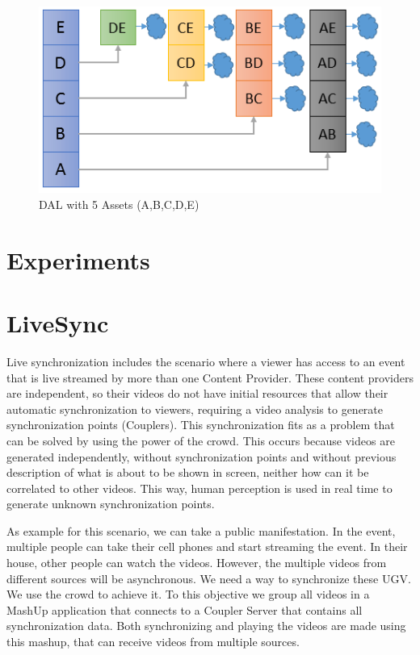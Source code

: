 \documentclass[jidm,a4paper]{jidm} %
\begin{document}
\begin{figure}
	\centering
	\includegraphics[scale=0.8]{figure/dal/dal}
	\caption{DAL with 5 Assets (A,B,C,D,E)}
	\label{dal}
\end{figure}


\section{Experiments}
\section{LiveSync}
Live synchronization includes the scenario where a viewer has access to an event that is live streamed by more than one Content Provider. These content providers are independent, so their videos do not have initial resources that allow their automatic synchronization to viewers, requiring a video analysis to generate synchronization points (Couplers). This synchronization fits as a problem that can be solved by using the power of the crowd. This occurs because videos are generated independently, without synchronization points and without previous description of what is about to be shown in screen, neither how can it be correlated to other videos. This way, human perception is used in real time to generate unknown synchronization points. 

As example for this scenario, we can take a public manifestation. In the event, multiple people can take their cell phones and start streaming the event. In their house, other people can watch the videos. However, the multiple videos from different sources will be asynchronous. We need a way to synchronize these UGV. We use the crowd to achieve it. To this objective we group all videos in a MashUp application that connects to a Coupler Server that contains all synchronization data. Both synchronizing and playing the videos are made using this mashup, that can receive videos from multiple sources.
\end{document}
